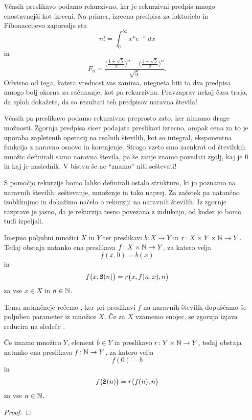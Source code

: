 Včasih preslikavo podamo rekurzivno, ker je rekurzivni predpis mnogo enostavnejši kot izrecni. Na primer, izrecna predpisa za faktorielo in Fibonaccijevo zaporedje sta
\[n! = \int_0^\infty x^n e^{-x} \; dx\]
in
\[F_n = \frac{\Big(\frac{1+\sqrt{5}}{2}\Big)^n - \Big(\frac{1-\sqrt{5}}{2}\Big)^n}{\sqrt{5}}.\]
Odvisno od tega, katera vrednost vas zanima, utegneta biti ta dva predpisa mnogo bolj okorna za računanje, kot pa rekurzivna. Pravzaprav nekaj časa traja, da sploh dokažete, da so rezultati teh predpisov naravna števila!

Včasih pa preslikavo podamo rekurzivno preprosto zato, ker nimamo druge možnosti. Zgornja predpisa sicer podajata preslikavi izrecno, ampak cena za to je uporaba zapletenih operacij na realnih številih, kot so integral, eksponentna funkcija z naravno osnovo in korenjenje. Strogo vzeto smo zaenkrat od številskih množic definirali samo naravna števila, pa še zanje znamo povedati zgolj, kaj je $0$ in kaj je naslednik. V bistvu še ne ``znamo'' niti seštevati!

S pomočjo rekurzije bomo lahko definirali ostalo strukturo, ki jo poznamo na naravnih številih: seštevanje, množenje in tako naprej. Za začetek pa natančno izoblikujmo in dokažimo načelo o rekurziji na naravnih številih. Iz zgornje razprave je jasno, da je rekurzija tesno povezana z indukcijo, od koder jo bomo tudi izpeljali.

\begin{izrek}\label{izrek:rekurzija}
Imejmo poljubni množici $X$ in $Y$ ter preslikavi $b\colon X \to Y$ in $r\colon X \times Y \times \mathbb{N} \to Y$. Tedaj obstaja natanko ena preslikava $f\colon X \times \mathbb{N} \to Y$, za katero velja
\[f(x, 0) = b(x)\]
in
\[f\big(x, \mathtt{S}(n)\big) = r\big(x, f(n, x), n\big)\]
za vse $x \in X$ in $n \in \mathbb{N}$.

Temu natančneje rečemo , ker pri preslikavi $f$ na naravnih številih dopuščamo še poljuben parameter iz množice $X$. Če za $X$ vzamemo enojec, se zgornja izjava reducira na sledeče .

Če imamo množico $Y$, element $b \in Y$ in preslikavo $r\colon Y \times \mathbb{N} \to Y$, tedaj obstaja natanko ena preslikava $f\colon \mathbb{N} \to Y$, za katero velja
\[f(0) = b\]
in
\[f\big(\mathtt{S}(n)\big) = r\big(f(n), n\big)\]
za vse $n \in \mathbb{N}$.
\end{izrek}

\begin{proof}
\end{proof}

